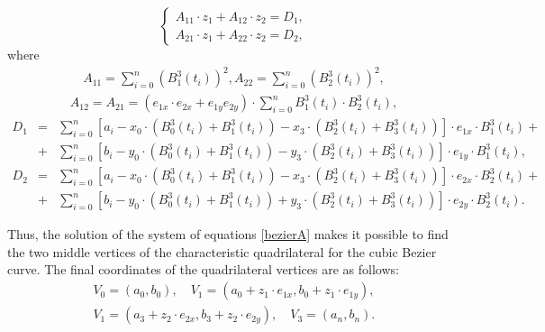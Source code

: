 \documentclass[12pt]{article}
\begin{document}
 \begin{equation}
 \label{bezierA}
 \left\{\begin{array}{l} {A_{11} \cdot z_{1} +A_{12} \cdot z_{2} =D_{1} ,} \\ {A_{21} \cdot z_{1} +A_{22} \cdot z_{2} =D_{2}, } \end{array}\right.
 \end{equation}
 where
 \begin{eqnarray*}
 A_{11} =\sum _{i=0}^{n}\left(B_{1}^{3} \left(t_{i} \right)\right)^{2}  , A_{22} =\sum _{i=0}^{n}\left(B_{2}^{3} \left(t_{i} \right)\right)^{2},
 \end{eqnarray*}
 \begin{eqnarray*}
 A_{12} =A_{21} =\left(e_{1x} \cdot e_{2x} +e_{1y} e_{2y} \right)\cdot \sum _{i=0}^{n}B_{1}^{3} \left(t_{i} \right)\cdot B_{2}^{3} \left(t_{i} \right),
 \end{eqnarray*}
 \begin{eqnarray*}
 D_{1} &=&\sum _{i=0}^{n}\left[a_{i} -x_{0} \cdot \left(B_{0}^{3} \left(t_{i} \right)+B_{1}^{3} \left(t_{i} \right)\right)-x_{3} \cdot \left(B_{2}^{3} \left(t_{i} \right)+B_{3}^{3} \left(t_{i} \right)\right)\right]\cdot e_{1x} \cdot B_{1}^{3} \left(t_{i} \right) + \\ 
 &+&\sum _{i=0}^{n}\left[b{}_{i} -y_{0} \cdot \left(B_{0}^{3} \left(t_{i} \right)+B_{1}^{3} \left(t_{i} \right)\right)-y_{3} \cdot \left(B_{2}^{3} \left(t_{i} \right)+B_{3}^{3} \left(t_{i} \right)\right)\right]\cdot e_{1y} \cdot B_{1}^{3} \left(t_{i} \right) ,
 \end{eqnarray*}
 \begin{eqnarray*}
 D_{2} &=& \sum _{i=0}^{n}\left[a_{i} -x_{0} \cdot \left(B_{0}^{3} \left(t_{i} \right)+B_{1}^{3} \left(t_{i} \right)\right)-x_{3} \cdot \left(B_{2}^{3} \left(t_{i} \right)+B_{3}^{3} \left(t_{i} \right)\right)\right] \cdot e_{2x} \cdot B_{2}^{3} \left(t_{i} \right)+ \\ 
 &+&\sum _{i=0}^{n}\left[b_{i} -y_{0} \cdot \left(B_{0}^{3} \left(t_{i} \right)+B_{1}^{3} \left(t_{i} \right)\right)+y_{3} \cdot \left(B_{2}^{3} \left(t_{i} \right)+B_{3}^{3} \left(t_{i} \right)\right)\right]\cdot e_{2y} \cdot B_{2}^{3} \left(t_{i} \right) .
 \end{eqnarray*}
 
 Thus, the solution of the system of equations \eqref{bezierA} makes it possible to find the two middle vertices
 of the characteristic quadrilateral for the cubic Bezier curve. The final coordinates of the quadrilateral vertices are as follows:
 \begin{eqnarray}
 V_{0} =(a_{0} ,b_{0} ),\quad V_{1} =(a_{0} +z_{1} \cdot e_{1x} ,b_{0} +z_{1} \cdot e_{1y} ), \nonumber \\ V_{1} =(a_{3} +z_{2} \cdot e_{2x} ,b_{3} +z_{2} \cdot e_{2y} ),\quad V_{3} =(a_{n} ,b_{n} ).
 \end{eqnarray}
 
\end{document}
